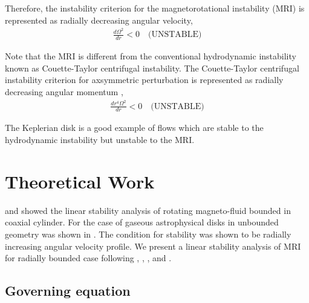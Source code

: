 \documentclass{jfm}
\begin{document}
Therefore, the instability criterion for the magnetorotational instability (MRI) is represented as radially decreasing angular velocity,
\begin{align}
    \frac{d \Omega^2}{dr}<0 \quad \text{(UNSTABLE)}
\end{align} 

Note that the MRI is different from the conventional hydrodynamic instability known as Couette-Taylor centrifugal instability. The Couette-Taylor centrifugal instability criterion for axsymmetric perturbation is represented as radially decreasing angular momentum \cite[see][]{Charru2011},
\begin{align}
    \frac{d r^4 \Omega^2}{dr} <0 \quad \text{(UNSTABLE)}
\end{align}

The Keplerian disk is a good example of flows which are stable to the hydrodynamic instability but unstable to the MRI.



\section{Theoretical Work}
\label{sec:theory}

\cite{Acheson1973} and \cite{Knobloch1992} showed the linear stability analysis
of rotating magneto-fluid bounded in coaxial cylinder. For the case of gaseous 
astrophysical disks in unbounded geometry was shown in \cite{Balbus1991}. The 
condition for stability was shown to be radially increasing angular velocity 
profile. We present a linear stability analysis of MRI for radially bounded case 
following \cite{Acheson1972}, \cite{Acheson1973a}, \cite{Knobloch1992}, and 
\cite{Julien2010}.


%
%
\subsection{Governing equation}
\end{document}
